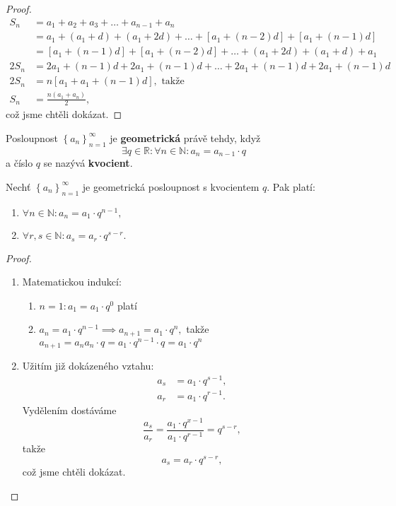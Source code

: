 \begin{proof}
\begin{align*}
    S_n &= a_1+a_2+a_3+\dots+a_{n-1}+a_n \\
    &= a_1 + (a_1+d)+ (a_1+2d)+ \dots + [a_1+(n-2)d]+[a_1+(n-1)d]\\
    &= [a_1+(n-1)d]+[a_1+(n-2)d]+\dots+(a_1+2d)+(a_1+d)+a_1\\
    2S_n &= 2a_1 + (n-1)d + 2a_1 + (n-1)d + \dots + 2a_1 + (n-1)d + 2a_1 + (n-1)d\\
    2S_n &= n [a_1 + a_1 + (n-1)d], \textrm{ takže }\\
    S_n &= \frac{n(a_1+a_n)}{2},
\end{align*}
což jsme chtěli dokázat. \qedhere
\end{proof}

\begin{definition}
Posloupnost $\left \{ a_n \right \}_{n=1}^\infty $ je \textbf{geometrická} právě
tehdy, když
$$\exists q \in \mathbb R: \forall n \in \mathbb N: a_n=a_{n-1}\cdot q$$
a číslo $q$ se nazývá \textbf{kvocient}.
\end{definition}

\begin{veta}
    Nechť $\left \{ a_n \right \}_{n=1}^\infty $ je geometrická posloupnost s kvocientem
    $q$. Pak platí:
    \begin{enumerate}[$i.$]
    \item $\forall n\in \mathbb N: a_n = a_1 \cdot q^{n-1},$
   	\item $\forall r,s \in \mathbb N: a_s = a_r \cdot q^{s-r}.$
    \end{enumerate}
\end{veta}

\begin{proof}
\begin{enumerate}[$i.$]
\item Matematickou indukcí:
\begin{enumerate}[1.]
\item $n=1: a_1 = a_1\cdot q^0$ platí
\item $a_n = a_1\cdot q^{n-1}\implies a_{n+1}=a_1\cdot q^n,$ takže $a_{n+1}=a_na_n\cdot q=a_1\cdot q^{n-1}\cdot q=a_1\cdot q^n$
\end{enumerate}
\item Užitím již dokázeného vztahu:
\begin{align*}
    a_s &= a_1\cdot q^{s-1},\\
    a_r &= a_1\cdot q^{r-1}.
\end{align*}
Vydělením dostáváme
$$\frac{a_s}{a_r} = \frac{a_1\cdot q^{x-1}}{a_1\cdot q^{r-1}}=q^{s-r},$$
takže
$$a_s=a_r\cdot q^{s-r},$$
což jsme chtěli dokázat.\qedhere
\end{enumerate}
\end{proof}

